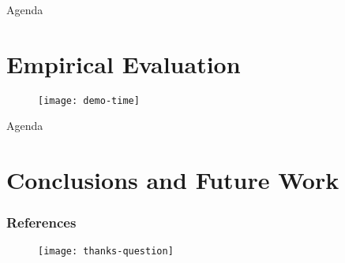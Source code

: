 \documentclass{beamer}
\begin{document}
  \begin{frame}{Agenda}
    \section{Empirical Evaluation}
  \end{frame}

  

  \begin{frame}
    \begin{figure}
      \centering
      \texttt{[image: demo-time]}
    \end{figure}
  \end{frame} 

  \begin{frame}{Agenda}
    \section{Conclusions and Future Work}
  \end{frame}

  

  \begin{frame}[allowframebreaks]
    \frametitle{References}
    
    
  \end{frame}

  \begin{frame}
    \begin{figure}
      \centering
      \texttt{[image: thanks-question]}
    \end{figure}
  \end{frame}  

  \iffalse
  
  \fi

  
\end{document}
